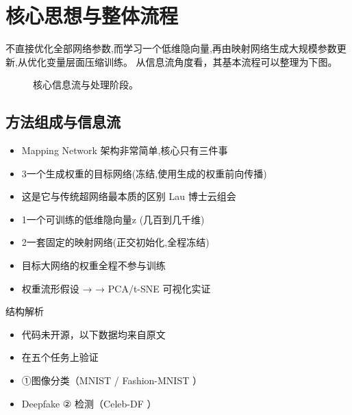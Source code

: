 \documentclass[UTF8,11pt,a4paper]{ctexart}
\begin{document}
\section{核心思想与整体流程}
不直接优化全部网络参数,而学习一个低维隐向量,再由映射网络生成大规模参数更新,从优化变量层面压缩训练。 从信息流角度看，其基本流程可以整理为下图。

\begin{figure}[H]
\centering
{}
\caption{核心信息流与处理阶段。}
\end{figure}

\subsection{方法组成与信息流}
\begin{itemize}
\item Mapping Network 架构非常简单,核心只有三件事
\item 3一个生成权重的目标网络(冻结,使用生成的权重前向传播)
\item 这是它与传统超网络最本质的区别 Lau 博士云组会
\item 1一个可训练的低维隐向量z (几百到几千维)
\item 2一套固定的映射网络(正交初始化,全程冻结)
\item 目标大网络的权重全程不参与训练
\item 权重流形假设 → → PCA/t-SNE 可视化实证
\end{itemize}

\begin{keybox}{结构解析}
\begin{itemize}
\item 代码未开源，以下数据均来自原文
\item 在五个任务上验证
\item ①图像分类（MNIST / Fashion-MNIST ）
\item Deepfake ② 检测（Celeb-DF ）
\end{itemize}
\end{keybox}
\end{document}
